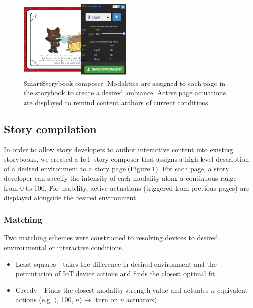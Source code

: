 \documentclass{sigchi}
\newcommand\namesp{SmartStorybook }
\newcommand*{\quoted}[1]{{\small{\fontfamily{cmss}\selectfont{#1}}}}
\begin{document}
\begin{figure}[t!]
    \centering
    \includegraphics[keepaspectratio, width=0.5\textwidth]{figures/composer.pdf} 
    \caption{\namesp composer. Modalities are assigned to each page in the storybook to create a desired ambiance. Active page actuations are displayed to remind content authors of current conditions.}
    \vspace{-10pt}
    \label{fig:composer} 
  \end{figure}
 

\subsection{Story compilation}

In order to allow story developers to author interactive content into existing storybooks, we created a IoT story composer that assigns a high-level description of a desired environment to a story page (Figure \ref{fig:composer}). For each page, a story developer can specify the intensity of each modality along a continuous range from 0 to 100. For usability, active actuations (triggered from previous pages) are displayed alongside the desired environment.

\subsubsection{Matching}
Two matching schemes were constructed to resolving devices to desired environmental or interactive conditions. 
\begin{itemize}
\item Least-squares - takes the difference in desired environment and the permutation of IoT device actions and finds the closest optimal fit. 
\item Greedy - Finds the closest modality strength value and actuates $n$ equivalent actions (e.g. $\langle$\quoted{light}, 100, $n \rangle \rightarrow$ turn on $n$ \quoted{light} actuators). 

\end{itemize}
\end{document}
